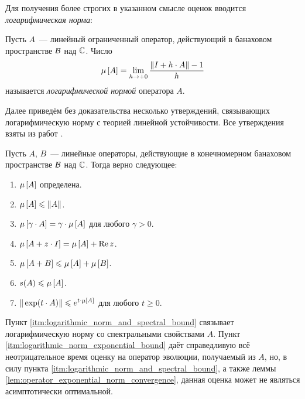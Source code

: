 Для получения более строгих в указанном смысле оценок вводится \emph{логарифмическая норма}:

\begin{definition}
    \label{def:logarithmic_norm}
    Пусть $ A $~--- линейный ограниченный оператор, действующий в банаховом пространстве $ \mathcal{B} $ над $ \mathbb{C} $.
    Число
    \begin{equation}
        \label{eq:logarithmic_norm}
        \mu \left[ A \right] = \lim_{h \to +0} \frac{\| I + h \cdot A \| - 1}{h}
    \end{equation}
    называется \emph{логарифмической нормой} оператора $ A $.
\end{definition}

Далее приведём без доказательства несколько утверждений,
связывающих логарифмическую норму с теорией линейной устойчивости.
Все утверждения взяты из работ \cite{soderlind2006lognorm, lambert1991methods}.

\begin{statement}
    \label{stat:logarithmic_norm_properties}
    Пусть $ A $, $ B $~--- линейные операторы, действующие в конечномерном банаховом пространстве $ \mathcal{B} $ над $ \mathbb{C} $.
    Тогда верно следующее:
    \begin{enumerate}[itemsep=0em]
        \item $ \mu \left[ A \right] $ определена.
        \item $ \mu \left[ A \right] \leqslant \| A \| $.
        \item $ \mu \left[ \gamma \cdot A \right] = \gamma \cdot \mu \left[ A \right] $ для любого $ \gamma > 0 $.
        \item $ \mu \left[ A + z \cdot I \right] = \mu \left[ A \right] + \operatorname{Re} z $.
        \item $ \mu \left[ A + B \right] \leqslant \mu \left[ A \right] + \mu \left[ B \right] $.
        \item $ s(A) \leqslant \mu \left[ A \right] $. \label{itm:logarithmic_norm_and_spectral_bound}
        \item $ \| \exp(t \cdot A) \| \leqslant e^{t \cdot \mu \left[ A \right]} $ для любого $ t \geqslant 0 $. \label{itm:logarithmic_norm_exponential_bound}
    \end{enumerate}
\end{statement}

Пункт \ref{itm:logarithmic_norm_and_spectral_bound} связывает логарифмическую норму со спектральными свойствами $ A $.
Пункт \ref{itm:logarithmic_norm_exponential_bound} даёт справедливую всё неотрицательное время оценку на оператор эволюции,
получаемый из $ A $, но, в силу пункта \ref{itm:logarithmic_norm_and_spectral_bound},
а также леммы \ref{lem:operator_exponential_norm_convergence},
данная оценка может не являться асимптотически оптимальной.


